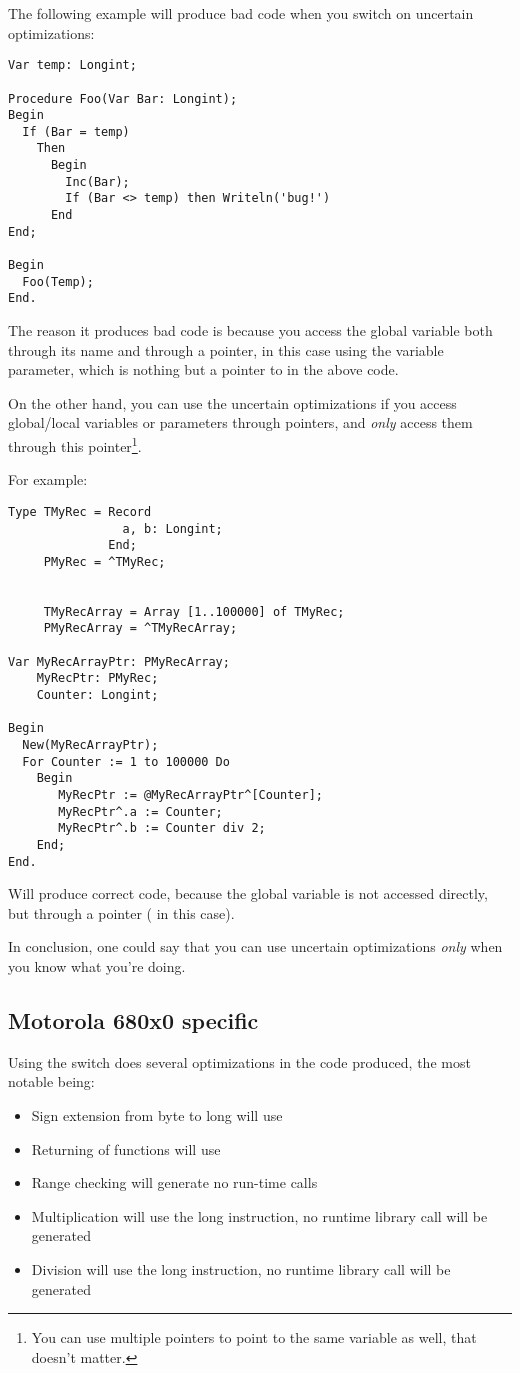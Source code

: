 \documentclass{report}
\begin{document}
\begin{enumerate}
The following example will produce bad code when you switch on
uncertain optimizations:
\begin{verbatim}
Var temp: Longint;

Procedure Foo(Var Bar: Longint);
Begin
  If (Bar = temp)
    Then
      Begin
        Inc(Bar);
        If (Bar <> temp) then Writeln('bug!')
      End
End;

Begin
  Foo(Temp);
End.
\end{verbatim}
The reason it produces bad code is because you access the global variable
 both through its name  and through a pointer, in this
case using the  variable parameter, which is nothing but a pointer
to  in the above code.

On the other hand, you can use the uncertain optimizations if
you access global/local variables or parameters through pointers,
and {\em only} access them through this pointer\footnote{
You can use multiple pointers to point to the same variable as well, that
doesn't matter.}.

For example:
\begin{verbatim}
Type TMyRec = Record
                a, b: Longint;
              End;
     PMyRec = ^TMyRec;


     TMyRecArray = Array [1..100000] of TMyRec;
     PMyRecArray = ^TMyRecArray;

Var MyRecArrayPtr: PMyRecArray;
    MyRecPtr: PMyRec;
    Counter: Longint;

Begin
  New(MyRecArrayPtr);
  For Counter := 1 to 100000 Do
    Begin
       MyRecPtr := @MyRecArrayPtr^[Counter];
       MyRecPtr^.a := Counter;
       MyRecPtr^.b := Counter div 2;
    End;
End.
\end{verbatim}
Will produce correct code, because the global variable 
is not accessed directly, but through a pointer ( in this
case).

In conclusion, one could say that you can use uncertain optimizations {\em
only} when you know what you're doing.
\end{enumerate}

\subsection{ Motorola 680x0 specific }

Using the  switch does several optimizations in the
code produced, the most notable being:

\begin{itemize}
\item Sign extension from byte to long will use 
\item Returning of functions will use 
\item Range checking will generate no run-time calls
\item Multiplication will use the long  instruction, no
runtime library call will be generated
\item Division will use the long  instruction, no
runtime library call will be generated
\end{itemize}
\end{document}
